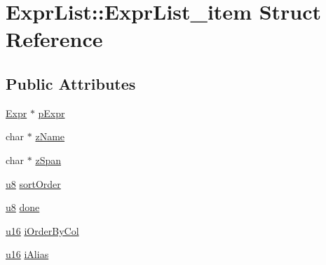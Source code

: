 \hypertarget{struct_expr_list_1_1_expr_list__item}{\section{Expr\-List\-:\-:Expr\-List\-\_\-item Struct Reference}
\label{struct_expr_list_1_1_expr_list__item}
}
\subsection*{Public Attributes}
\begin{DoxyCompactItemize}
\item 
\hyperlink{struct_expr}{Expr} $\ast$ \hyperlink{struct_expr_list_1_1_expr_list__item_a75906cf3ff19e5bf16373fec7f3c79ad}{p\-Expr}
\item 
char $\ast$ \hyperlink{struct_expr_list_1_1_expr_list__item_af278eb03a1169c73d144547adaf9b04f}{z\-Name}
\item 
char $\ast$ \hyperlink{struct_expr_list_1_1_expr_list__item_ade485bb6fafb44ec2aba59d05b8d117b}{z\-Span}
\item 
\hyperlink{sqlite3_8c_a74a0f6424ae628af25f23f0a35f6ead3}{u8} \hyperlink{struct_expr_list_1_1_expr_list__item_af9084dc073f96792c0c7a8a894778881}{sort\-Order}
\item 
\hyperlink{sqlite3_8c_a74a0f6424ae628af25f23f0a35f6ead3}{u8} \hyperlink{struct_expr_list_1_1_expr_list__item_a84aad270c98e28a725a840aac3ee8576}{done}
\item 
\hyperlink{sqlite3_8c_a20f2299e322dcbde37cb07b16910b843}{u16} \hyperlink{struct_expr_list_1_1_expr_list__item_ae1d4a3f24152d41772694bebef2ef81c}{i\-Order\-By\-Col}
\item 
\hyperlink{sqlite3_8c_a20f2299e322dcbde37cb07b16910b843}{u16} \hyperlink{struct_expr_list_1_1_expr_list__item_a06fc9fdfb94d35ec6ca742da23609239}{i\-Alias}
\end{DoxyCompactItemize}


